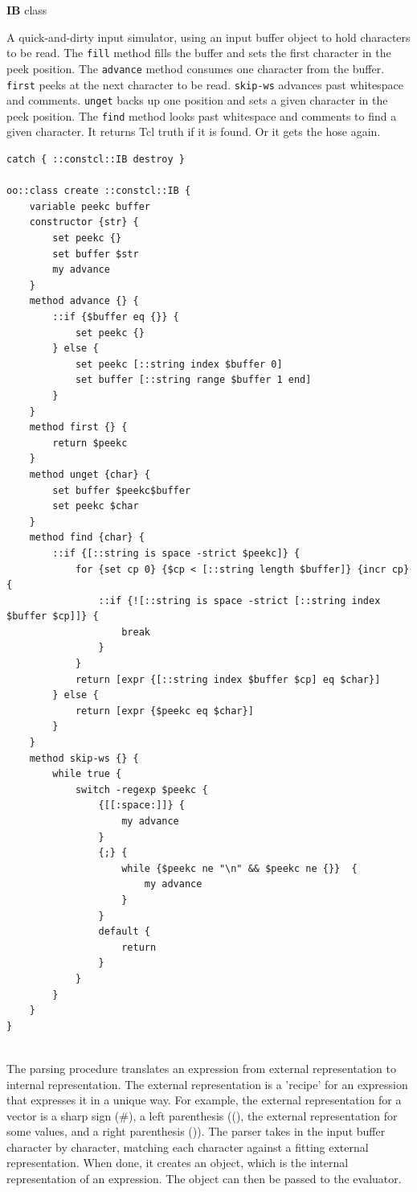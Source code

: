 \documentclass[twoside,9pt]{report}
\begin{document}
\textbf{IB} class


A quick-and-dirty input simulator, using an input buffer object to hold characters to be read. The \texttt{fill} method fills the buffer and sets the first character in the peek position. The \texttt{advance} method consumes one character from the buffer. \texttt{first} peeks at the next character to be read. \texttt{skip-ws} advances past whitespace and comments. \texttt{unget} backs up one position and sets a given character in the peek position. The \texttt{find} method looks past whitespace and comments to find a given character. It returns Tcl truth if it is found. Or it gets the hose again.

\noindent\makebox[\linewidth]{\rule{\linewidth}{0.4pt}}
\begin{lstlisting}
catch { ::constcl::IB destroy }
 
oo::class create ::constcl::IB {
    variable peekc buffer
    constructor {str} {
        set peekc {}
        set buffer $str
        my advance
    }
    method advance {} {
        ::if {$buffer eq {}} {
            set peekc {}
        } else {
            set peekc [::string index $buffer 0]
            set buffer [::string range $buffer 1 end]
        }
    }
    method first {} {
        return $peekc
    }
    method unget {char} {
        set buffer $peekc$buffer
        set peekc $char
    }
    method find {char} {
        ::if {[::string is space -strict $peekc]} {
            for {set cp 0} {$cp < [::string length $buffer]} {incr cp} {
                ::if {![::string is space -strict [::string index $buffer $cp]]} {
                    break
                }
            }
            return [expr {[::string index $buffer $cp] eq $char}]
        } else {
            return [expr {$peekc eq $char}]
        }
    }
    method skip-ws {} {
        while true {
            switch -regexp $peekc {
                {[[:space:]]} {
                    my advance
                }
                {;} {
                    while {$peekc ne "\n" && $peekc ne {}}  {
                        my advance
                    }
                }
                default {
                    return
                }
            }
        }
    }
}
 
\end{lstlisting}
\noindent\makebox[\linewidth]{\rule{\linewidth}{0.4pt}}

The parsing procedure translates an expression from external representation to internal representation. The external representation is a 'recipe' for an expression that expresses it in a unique way. For example, the external representation for a vector is a sharp sign (\#), a left parenthesis ((), the external representation for some values, and a right parenthesis ()). The parser takes in the input buffer character by character, matching each character against a fitting external representation. When done, it creates an object, which is the internal representation of an expression. The object can then be passed to the evaluator.
\end{document}
